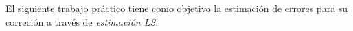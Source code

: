 	El siguiente trabajo práctico tiene como objetivo la estimación de errores para su correción a través de \emph{estimación LS}.


